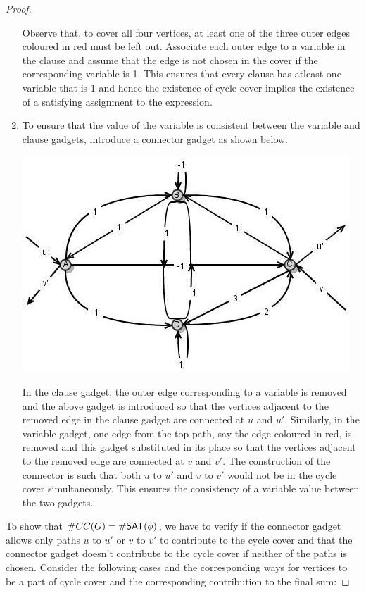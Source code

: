 \documentclass[11pt]{article}
\begin{document}
\begin{proof}
\begin{enumerate}
Observe that, to cover all four vertices, at least one of the three outer edges coloured in red must be left out. Associate each outer edge to a variable in the clause and assume that the edge is not chosen in the cover if the corresponding variable is 1. This ensures that every clause has atleast one variable that is 1 and hence the existence of cycle cover implies the existence of a satisfying assignment to the expression.
            \item
                To ensure that the value of the variable is consistent between the variable and clause gadgets, introduce a connector gadget as shown below.
                \begin{center}
                \includegraphics[scale=.75]{connector.jpg}
                \end{center}
                In the clause gadget, the outer edge corresponding to a variable is removed and the above gadget is introduced so that the vertices adjacent to the removed edge in the clause gadget are connected at $u$ and $u'$. Similarly, in the variable gadget, one edge from the top path, say the edge coloured in red, is removed and this gadget substituted in its place so that the vertices adjacent to the removed edge are connected at $v$ and $v'$. The construction of the connector is such that both $u$ to $u'$ and $v$ to $v'$ would not be in the cycle cover simultaneously. This ensures the consistency of a variable value between the two gadgets.
        \end{enumerate}
        To show that $\#CC(G)=\#{\mathsf{SAT}}(\phi)$, we have to verify if the connector gadget allows only paths $u$ to $u'$ or $v$ to $v'$ to contribute to the cycle cover and that the connector gadget doesn't contribute to the cycle cover if neither of the paths is chosen. Consider the following cases and the corresponding ways for vertices to be a part of cycle cover and the corresponding contribution to the final sum:

\end{proof}
\end{document}
